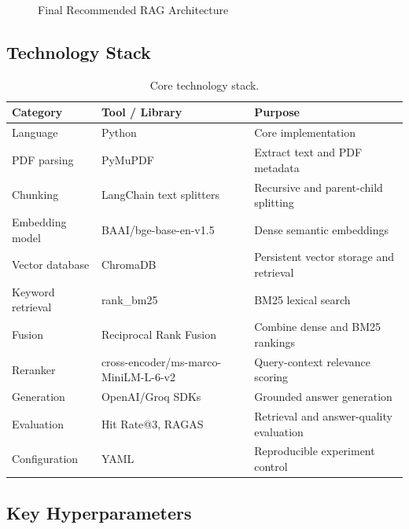 \documentclass[11pt]{article}
\begin{document}
\begin{figure}[H]
    \centering
    
    \caption{Final Recommended RAG Architecture}
    \label{fig:a4_final_recommended_architecture}
\end{figure}

\subsection{Technology Stack}

\begin{table}[H]
\centering
\small
\begin{tabular}{lll}
\toprule
Category & Tool / Library & Purpose \\
\midrule
Language & Python & Core implementation \\
PDF parsing & PyMuPDF & Extract text and PDF metadata \\
Chunking & LangChain text splitters & Recursive and parent-child splitting \\
Embedding model & BAAI/bge-base-en-v1.5 & Dense semantic embeddings \\
Vector database & ChromaDB & Persistent vector storage and retrieval \\
Keyword retrieval & rank\_bm25 & BM25 lexical search \\
Fusion & Reciprocal Rank Fusion & Combine dense and BM25 rankings \\
Reranker & cross-encoder/ms-marco-MiniLM-L-6-v2 & Query-context relevance scoring \\
Generation & OpenAI/Groq SDKs & Grounded answer generation \\
Evaluation & Hit Rate@3, RAGAS & Retrieval and answer-quality evaluation \\
Configuration & YAML & Reproducible experiment control \\
\bottomrule
\end{tabular}
\caption{Core technology stack.}
\end{table}

\subsection{Key Hyperparameters}
\end{document}
